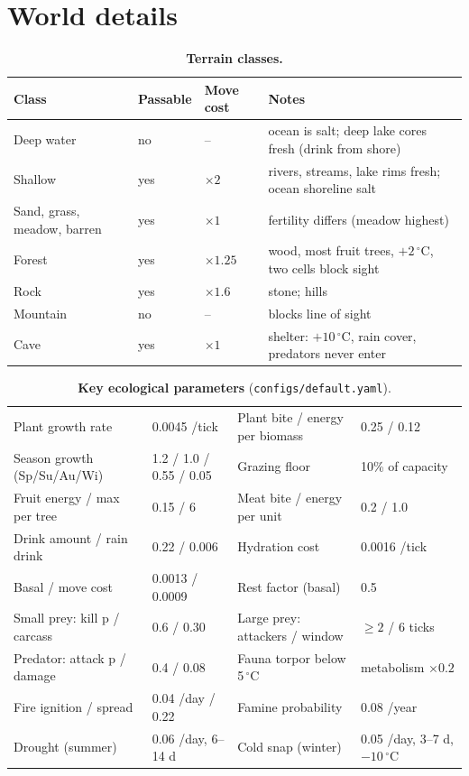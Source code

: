 \documentclass[10pt]{article}
\begin{document}
\section{World details}
\label{app:world}

\begin{table}[h]
\centering\small
\caption{\textbf{Terrain classes.}}
\begin{tabular}{@{}llll@{}}
\toprule
Class & Passable & Move cost & Notes\\
\midrule
Deep water & no & -- & ocean is salt; deep lake cores fresh (drink from shore)\\
Shallow & yes & $\times2$ & rivers, streams, lake rims fresh; ocean shoreline salt\\
Sand, grass, meadow, barren & yes & $\times1$ & fertility differs (meadow highest)\\
Forest & yes & $\times1.25$ & wood, most fruit trees, $+2\,^\circ$C, two cells block sight\\
Rock & yes & $\times1.6$ & stone; hills\\
Mountain & no & -- & blocks line of sight\\
Cave & yes & $\times1$ & shelter: $+10\,^\circ$C, rain cover, predators never enter\\
\bottomrule
\end{tabular}
\end{table}

\begin{table}[h]
\centering\small
\caption{\textbf{Key ecological parameters} (\texttt{configs/default.yaml}).}
\footnotesize\setlength{\tabcolsep}{3pt}\begin{tabular}{@{}ll@{\hspace{1em}}ll@{}}
\toprule
Plant growth rate & 0.0045 /tick & Plant bite / energy per biomass & 0.25 / 0.12\\
Season growth (Sp/Su/Au/Wi) & 1.2 / 1.0 / 0.55 / 0.05 & Grazing floor & 10\% of capacity\\
Fruit energy / max per tree & 0.15 / 6 & Meat bite / energy per unit & 0.2 / 1.0\\
Drink amount / rain drink & 0.22 / 0.006 & Hydration cost & 0.0016 /tick\\
Basal / move cost & 0.0013 / 0.0009 & Rest factor (basal) & 0.5\\
Small prey: kill p / carcass & 0.6 / 0.30 & Large prey: attackers / window & $\geq2$ / 6 ticks\\
Predator: attack p / damage & 0.4 / 0.08 & Fauna torpor below 5\,$^\circ$C & metabolism $\times0.2$\\
Fire ignition / spread & 0.04 /day / 0.22 & Famine probability & 0.08 /year\\
Drought (summer) & 0.06 /day, 6--14 d & Cold snap (winter) & 0.05 /day, 3--7 d, $-10\,^\circ$C\\
\bottomrule
\end{tabular}
\end{table}
\end{document}
